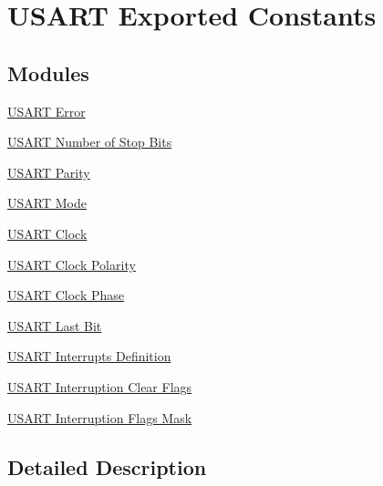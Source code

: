 \hypertarget{group___u_s_a_r_t___exported___constants}{}\section{U\+S\+A\+RT Exported Constants}
\label{group___u_s_a_r_t___exported___constants}
\subsection*{Modules}
\begin{DoxyCompactItemize}
\item 
\hyperlink{group___u_s_a_r_t___error}{U\+S\+A\+R\+T Error}
\item 
\hyperlink{group___u_s_a_r_t___stop___bits}{U\+S\+A\+R\+T Number of Stop Bits}
\item 
\hyperlink{group___u_s_a_r_t___parity}{U\+S\+A\+R\+T Parity}
\item 
\hyperlink{group___u_s_a_r_t___mode}{U\+S\+A\+R\+T Mode}
\item 
\hyperlink{group___u_s_a_r_t___clock}{U\+S\+A\+R\+T Clock}
\item 
\hyperlink{group___u_s_a_r_t___clock___polarity}{U\+S\+A\+R\+T Clock Polarity}
\item 
\hyperlink{group___u_s_a_r_t___clock___phase}{U\+S\+A\+R\+T Clock Phase}
\item 
\hyperlink{group___u_s_a_r_t___last___bit}{U\+S\+A\+R\+T Last Bit}
\item 
\hyperlink{group___u_s_a_r_t___interrupt__definition}{U\+S\+A\+R\+T Interrupts Definition}
\item 
\hyperlink{group___u_s_a_r_t___i_t___c_l_e_a_r___flags}{U\+S\+A\+R\+T Interruption Clear Flags}
\item 
\hyperlink{group___u_s_a_r_t___interruption___mask}{U\+S\+A\+R\+T Interruption Flags Mask}
\end{DoxyCompactItemize}


\subsection{Detailed Description}
